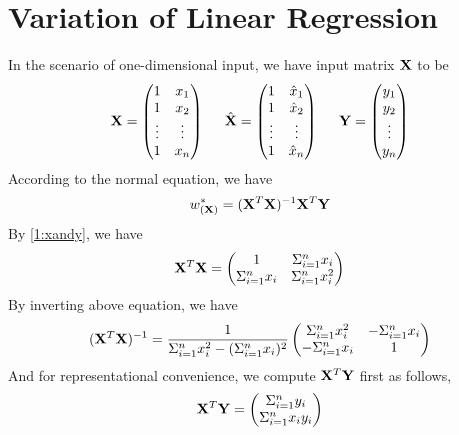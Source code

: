 \documentclass[11pt,a4paper]{article}
\begin{document}
\section{Variation of Linear Regression}
In the scenario of one-dimensional input, we have input matrix $\mathbf{X}$ to be
\begin{align} \label{1:xandy}
    \mathbf{X} = 
    \begin{pmatrix}
        1 & x_1 \\
        1 & x_2 \\
        \vdots & \vdots \\
        1 & x_n 
    \end{pmatrix} \hspace{0.5cm}
        \hat{\mathbf{X}}  = 
    \begin{pmatrix}
        1 & \hat{x}_1 \\
        1 & \hat{x}_2 \\
        \vdots & \vdots \\
        1 & \hat{x}_n 
    \end{pmatrix} \hspace{0.5cm}
    \mathbf{Y} = 
    \begin{pmatrix}
        y_1 \\
        y_2 \\
        \vdots \\
        y_n 
    \end{pmatrix}
\end{align}
According to the normal equation, we have
\begin{align}
    w_{(\mathbf{X})}^* = (\mathbf{X}^T \mathbf{X})^{-1} \mathbf{X}^{T} \mathbf{Y}
\end{align}
By \eqref{1:xandy}, we have
\begin{align}
    \mathbf{X}^T \mathbf{X} = 
    \begin{pmatrix}
        1 & \Sigma_{i=1}^{n} x_i \\
        \Sigma_{i=1}^{n} x_i & \Sigma_{i=1}^{n} x_i^2 
    \end{pmatrix}
\end{align}
By inverting above equation, we have
\begin{align}
    (\mathbf{X}^T \mathbf{X})^{-1} = \frac{1}{\Sigma_{i=1}^{n} x_i^2 - (\Sigma_{i=1}^{n} x_i)^2}
    \begin{pmatrix}
        \Sigma_{i=1}^{n} x_i^2 & -\Sigma_{i=1}^{n} x_i \\
        -\Sigma_{i=1}^{n} x_i & 1
    \end{pmatrix} 
\end{align}
And for representational convenience, we compute $\mathbf{X}^{T} \mathbf{Y}$ first as follows,
\begin{align}
    \mathbf{X}^{T} \mathbf{Y} = 
    \begin{pmatrix}
        \Sigma_{i=1}^{n} y_i \\ \Sigma_{i=1}^{n} x_i y_i 
    \end{pmatrix}
\end{align}
\end{document}
